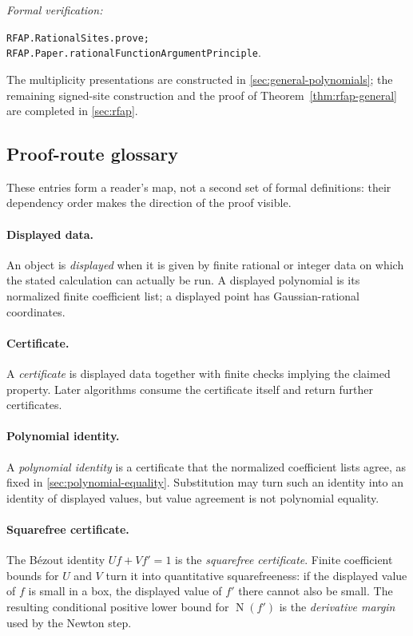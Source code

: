 \documentclass[11pt]{article}
\newcommand{\Norm}[1]{\operatorname{N}\!\left(#1\right)}
\newcommand{\Thmref}[1]{Theorem~\ref{#1}}
\newcommand{\leanref}[1]{\par\smallskip\noindent
  \emph{Formal verification:}\par\nobreak
  {\raggedright\nolinkurl{#1}.\par}}
\begin{document}
\leanref{RFAP.RationalSites.prove;
RFAP.Paper.rationalFunctionArgumentPrinciple}

The multiplicity presentations are constructed in
\cref{sec:general-polynomials}; the remaining signed-site construction and
the proof of \Thmref{thm:rfap-general} are completed in \cref{sec:rfap}.

\subsection{Proof-route glossary}
\label{sec:proof-route-glossary}

These entries form a reader's map, not a second set of formal definitions:
their dependency order makes the direction of the proof visible.

\paragraph{Displayed data.}
An object is \emph{displayed} when it is given by finite rational or integer
data on which the stated calculation can actually be run.  A displayed
polynomial is its normalized finite coefficient list; a displayed point has
Gaussian-rational coordinates.

\paragraph{Certificate.}
A \emph{certificate} is displayed data together with finite checks implying
the claimed property.  Later algorithms consume the certificate itself and
return further certificates.

\paragraph{Polynomial identity.}
A \emph{polynomial identity} is a certificate that the normalized
coefficient lists agree, as fixed in \cref{sec:polynomial-equality}.
Substitution may turn such an identity into an
identity of displayed values, but value agreement is not polynomial
equality.

\paragraph{Squarefree certificate.}
The B\'ezout identity $Uf+Vf'=1$ is the \emph{squarefree certificate}.  Finite
coefficient bounds for $U$ and $V$ turn it into quantitative squarefreeness:
if the displayed value of $f$ is small in a box, the displayed value of
$f'$ there cannot also be small.  The resulting conditional positive lower
bound for $\Norm{f'}$ is the \emph{derivative margin} used by the Newton step.
\end{document}
